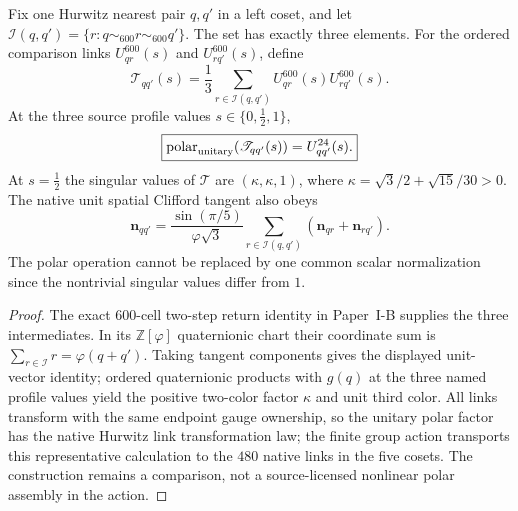 \documentclass[12pt,a4paper]{article}
\begin{document}
\begin{proposition}
\label{p10:prop:v3027-600-three-path-cartan}
Fix one Hurwitz nearest pair $q,q'$ in a left coset, and let
$\mathcal I(q,q')=\{r:q\sim_{600}r\sim_{600}q'\}$.
The set has exactly three elements. For the ordered comparison links
$U^{600}_{qr}(s)$ and $U^{600}_{rq'}(s)$, define
\[
 \mathscr T_{qq'}(s)=\frac13\sum_{r\in\mathcal I(q,q')}
 U^{600}_{qr}(s)U^{600}_{rq'}(s).
\]
At the three source profile values $s\in\{0,\tfrac12,1\}$,
\[
\boxed{\operatorname{polar}_{\rm unitary}(\mathscr T_{qq'}(s))
     =U^{24}_{qq'}(s).}
\]
At $s=\tfrac12$ the singular values of $\mathscr T$ are
$(\kappa,\kappa,1)$, where
$\kappa=\sqrt3/2+\sqrt{15}/30>0$.
The native unit spatial Clifford tangent also obeys
\[
\boxed{\mathbf n_{qq'}=
 \frac{\sin(\pi/5)}{\varphi\sqrt3}
 \sum_{r\in\mathcal I(q,q')}
   (\mathbf n_{qr}+\mathbf n_{rq'}).}
\]
The polar operation cannot be replaced by one common scalar
normalization since the nontrivial singular values differ from $1$.
\end{proposition}
\begin{proof}
The exact $600$-cell two-step return identity in Paper~I-B
supplies the three intermediates. In its $\mathbb Z[\varphi]$
quaternionic chart their coordinate sum is
$\sum_{r\in\mathcal I}r=\varphi(q+q')$.
Taking tangent components gives the displayed unit-vector identity;
ordered quaternionic products with $g(q)$ at the three named profile
values yield the positive two-color factor $\kappa$ and unit third
color. All links transform with the same endpoint gauge ownership,
so the unitary polar factor has the native Hurwitz link transformation
law; the finite group action transports this representative
calculation to the $480$ native links in the five cosets.
The construction remains a comparison, not a source-licensed
nonlinear polar assembly in the action.
\end{proof}
\end{document}
